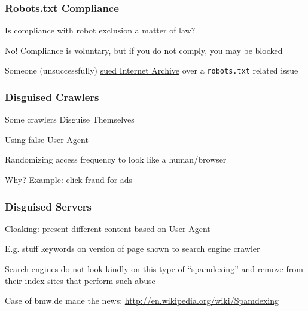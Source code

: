 \documentclass{beamer}
\begin{document}




 









 
\begin{frame} \frametitle{Robots.txt Compliance}

\begin{block}{Is compliance with robot exclusion a matter of law? }

No! Compliance is voluntary, but if you do not comply, you may be blocked

Someone (unsuccessfully) \href{http://www.theregister.co.uk/2007/07/26/wayback_firm_suit/}{sued Internet Archive} over a {\tt robots.txt} related issue

\end{block}
\end{frame}


\begin{frame} \frametitle{Disguised Crawlers}

\begin{block}{Some crawlers Disguise Themselves}

Using false User-Agent 

Randomizing access frequency to look like a human/browser

Why? Example: click fraud for ads

\end{block}

\end{frame}

\begin{frame} \frametitle{Disguised Servers}

\begin{block}{Cloaking:} 
present different content based on User-Agent

E.g. stuff keywords on version of page shown to search engine crawler
\end{block}

Search engines do not look kindly on this type of ``spamdexing'' and remove from their index sites that perform such abuse

\vfill

Case of bmw.de made the news: \url{http://en.wikipedia.org/wiki/Spamdexing}
\end{frame}
\end{document}
